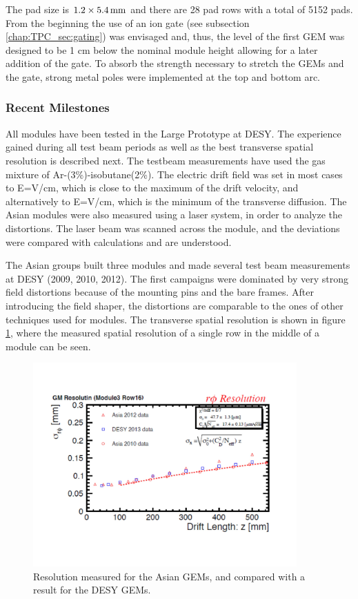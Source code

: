 The pad size is $1.2 \times \unit[5.4]{mm}$ and there are 28 pad rows with a total of 5152 pads.
From the beginning the use of an ion gate
(see subsection \ref{chap:TPC_sec:gating}) was envisaged and, thus, the level of the first GEM was designed
to be 1 cm below the nominal module height allowing for a later addition of the gate. To absorb the strength necessary
to stretch the GEMs and the gate, strong metal poles were implemented at the top and bottom arc.

\subsubsection{Recent Milestones}

All modules have been tested in the Large Prototype at DESY. The experience gained during all test beam periods as
well as the best transverse spatial resolution is described next. The testbeam measurements have used
the gas mixture of Ar-(3\%)-isobutane(2\%). The electric drift field was set in most cases to
E=\unit[230]{V/cm}, which is close to the maximum of the drift velocity, and alternatively to
E=\unit[130]{V/cm}, which is the minimum of the transverse diffusion.
The Asian modules were also measured using a laser system, in order to analyze the distortions.
The laser beam was scanned across the module, and the deviations were compared with calculations and are understood.

The Asian groups built three modules and made several test beam measurements at DESY (2009, 2010, 2012).
The first campaigns were dominated by very strong field distortions because of the mounting pins and the bare frames.
After introducing the field shaper, the distortions are comparable to the ones of other techniques used for modules.
The transverse spatial resolution is shown in figure \ref{fig_Fig2asiangemresolution}, where the measured spatial
resolution of a single row in the middle of a module can be seen.

\begin{figure}[!htb]
  \centering
  \includegraphics[width=0.9\textwidth]{Tracker/TPC_Bonn/plots/TPC-AG_Fig2asiangemresolution.pdf}
  \caption{Resolution measured for the Asian GEMs, and compared with a result for the DESY GEMs.}
  \label{fig_Fig2asiangemresolution}
\end{figure}

